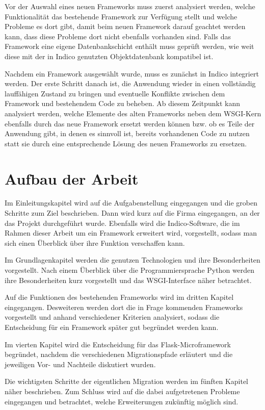 Vor der Auswahl eines neuen Frameworks muss zuerst analysiert werden, welche Funktionalität das
bestehende Framework zur Verfügung stellt und welche Probleme es dort gibt, damit beim neuen
Framework darauf geachtet werden kann, dass diese Probleme dort nicht ebenfalls vorhanden sind.
Falls das Framework eine eigene Datenbankschicht enthält muss geprüft werden, wie weit diese mit
der in Indico genutzten Objektdatenbank kompatibel ist.

Nachdem ein Framework ausgewählt wurde, muss es zunächst in Indico integriert werden. Der erste
Schritt danach ist, die Anwendung wieder in einen vollständig lauffähigen Zustand zu bringen und
eventuelle Konflikte zwischen dem Framework und bestehendem Code zu beheben. Ab diesem Zeitpunkt kann
analysiert werden, welche Elemente des alten Frameworks neben dem WSGI-Kern ebenfalls durch das neue
Framework ersetzt werden können bzw. ob es Teile der Anwendung gibt, in denen es sinnvoll ist,
bereits vorhandenen Code zu nutzen statt sie durch eine entsprechende Lösung des neuen Frameworks zu
ersetzen.


\section{Aufbau der Arbeit}

Im Einleitungskapitel wird auf die Aufgabenstellung eingegangen und die groben Schritte zum
Ziel beschrieben. Dann wird kurz auf die Firma eingegangen, an der das Projekt durchgeführt
wurde.
Ebenfalls wird die Indico-Software, die im Rahmen dieser Arbeit um ein Framework erweitert wird,
vorgestellt, sodass man sich einen Überblick über ihre Funktion verschaffen kann.

Im Grundlagenkapitel werden die genutzen Technologien und ihre Besonderheiten vorgestellt. Nach
einem Überblick über die Programmiersprache Python werden ihre Besonderheiten kurz
vorgestellt und das WSGI-Interface näher betrachtet.

Auf die Funktionen des bestehenden Frameworks wird im dritten Kapitel eingegangen. Desweiteren
werden dort die in Frage kommenden Frameworks vorgestellt und anhand verschiedener Kriterien
analysiert, sodass die Entscheidung für ein Framework später gut begründet werden kann.

Im vierten Kapitel wird die Entscheidung für das Flask-Microframework begründet, nachdem die
verschiedenen Migrationspfade erläutert und die jeweiligen Vor- und Nachteile diskutiert wurden.

Die wichtigsten Schritte der eigentlichen Migration werden im fünften Kapitel näher beschrieben. Zum
Schluss wird auf die dabei aufgetretenen Probleme eingegangen und betrachtet, welche Erweiterungen
zukünftig möglich sind.


